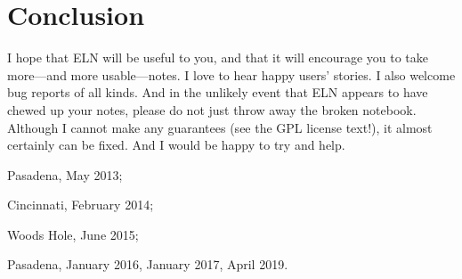 \documentclass[11pt]{report}
\begin{document}
\section{Conclusion}

I hope that ELN will be useful to you, and that it will encourage you
to take more---and more usable---notes. I love to hear happy users'
stories. I also welcome bug reports of all kinds. And in the unlikely
event that ELN appears to have chewed up your notes, please do not
just throw away the broken notebook. Although I cannot make any
guarantees (see the GPL license text!), it almost certainly can be
fixed. And I would be happy to try and help.

\bigskip

\noindent Pasadena, May 2013;

\noindent Cincinnati, February 2014;

\noindent Woods Hole, June 2015;

\noindent Pasadena, January 2016, January 2017, April 2019.
\end{document}
